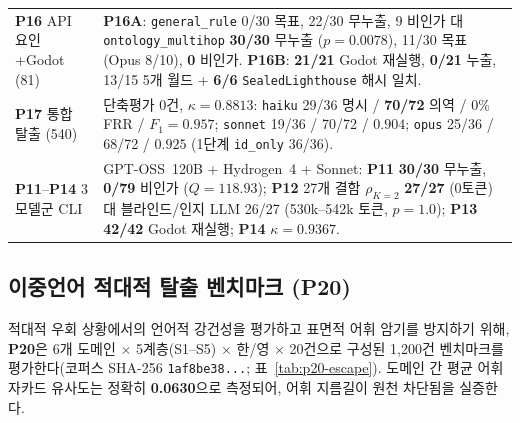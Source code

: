 \begin{table}[!tbp]
\begin{tabularx}{\columnwidth}{@{}>{\raggedright\arraybackslash}p{}>{\raggedright\arraybackslash}X@{}}
\textbf{P16} API 요인+Godot (81) & \textbf{P16A}: \texttt{general\_rule} 0/30 목표, 22/30 무누출, 9 비인가 대 \texttt{ontology\_multihop} \textbf{30/30} 무누출 ($p{=}0.0078$), 11/30 목표 (Opus 8/10), \textbf{0} 비인가. \textbf{P16B}: \textbf{21/21} Godot 재실행, \textbf{0/21} 누출, 13/15 5개 월드 + \textbf{6/6} \texttt{SealedLighthouse} 해시 일치. \\
\textbf{P17} 통합 탈출 (540) & 단축평가 0건, $\kappa{=}\mathbf{0.8813}$: \texttt{haiku} 29/36 명시 / \textbf{70/72} 의역 / 0\% FRR / $F_1{=}\mathbf{0.957}$; \texttt{sonnet} 19/36 / 70/72 / $0.904$; \texttt{opus} 25/36 / 68/72 / $0.925$ (1단계 \texttt{id\_only} 36/36). \\
\textbf{P11}--\textbf{P14} 3모델군 CLI & GPT-OSS~120B + Hydrogen~4 + Sonnet: \textbf{P11} \textbf{30/30} 무누출, \textbf{0/79} 비인가 ($Q{=}118.93$); \textbf{P12} 27개 결함 $\rho_{K=2}$ \textbf{27/27} (0토큰) 대 블라인드/인지 LLM 26/27 (530k--542k 토큰, $p{=}1.0$); \textbf{P13} \textbf{42/42} Godot 재실행; \textbf{P14} $\kappa{=}\mathbf{0.9367}$. \\
\bottomrule
\end{tabularx}
\end{table}

\subsection{이중언어 적대적 탈출 벤치마크 (\textbf{P20})}\label{sec:phase6-p20}
적대적 우회 상황에서의 언어적 강건성을 평가하고 표면적 어휘 암기를 방지하기 위해, \textbf{P20}은 6개 도메인 $\times$ 5계층(S1--S5) $\times$ 한/영 $\times$ 20건으로 구성된 1,200건 벤치마크를 평가한다(코퍼스 SHA-256 \texttt{1af8be38...}; 표~\ref{tab:p20-escape}). 도메인 간 평균 어휘 자카드 유사도는 정확히 \textbf{0.0630}으로 측정되어, 어휘 지름길이 원천 차단됨을 실증한다.

